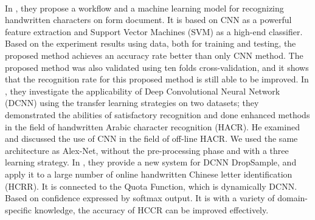 \documentclass[a4paper,12pt]{report}
\begin{document}
\paragraph{}
In \cite{Dar}, they propose a workflow and a machine learning model for recognizing handwritten characters on form document. It is based on CNN as a powerful feature extraction and Support Vector Machines (SVM) as a high-end classifier. Based on the experiment results using data, both for training and testing, the proposed method achieves an accuracy rate better than only CNN method. The proposed method was also validated using ten folds cross-validation, and it shows that the recognition rate for this proposed method is still able to be improved. In \cite{Cha}, they investigate the applicability of Deep Convolutional Neural Network (DCNN) using the transfer learning strategies on two datasets; they demonstrated the abilities of satisfactory recognition and done enhanced methods in the field of handwritten Arabic character recognition (HACR). He examined and discussed the use of CNN in the field of off-line HACR. We used the same architecture as Alex-Net, without the pre-processing phase and with a three learning strategy. In \cite{Wei}, they provide a new system for DCNN DropSample, and apply it to a large number of online handwritten Chinese letter identification (HCRR). It is connected to the Quota Function, which is dynamically DCNN. Based on confidence expressed by softmax output. It is with a variety of domain-specific knowledge, the accuracy of HCCR can be improved effectively. 
\end{document}
